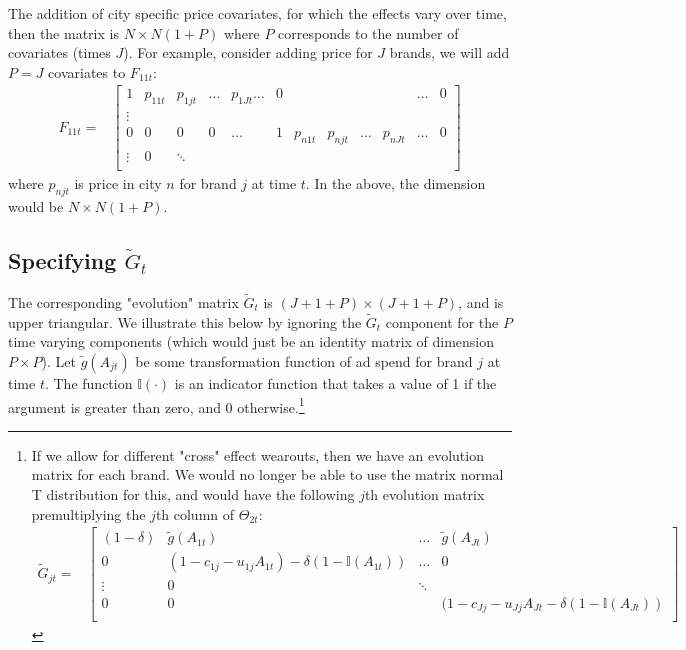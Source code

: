 \documentclass[letter,10pt]{article}
\newcommand{\Igtz}{\mathbb{I}}
\begin{document}
The addition of city specific price covariates, for which the effects vary over time, then the matrix is $N\times N(1+P)$
where $P$ corresponds to the number of covariates (times $J$).  For example, consider adding price for $J$ brands,
we will add $P=J$ covariates to $F_{11t}$:
\begin{equation}
\begin{array}{ll}
      F_{11t} = & \left[\begin{array}{cccccccccccc}
		 1 & p_{11t} & p_{1jt} & \ldots &p_{1Jt}\ldots & 0 &&&&&\ldots &0\\
\vdots\\
		0 &0 &0 &0 &\ldots & 1 & p_{n1t} & p_{njt} & \ldots &p_{nJt}  & \ldots & 0 \\
\vdots & 0 & \ddots \\
		\end{array}\right]
\end{array}
\end{equation}
where $p_{njt}$ is price in city $n$ for brand $j$ at time $t$.   In the above, the dimension would be $N \times N(1+P)$.


\subsection{Specifying $\tilde{G}_t$}

The corresponding "evolution" matrix $\tilde{G}_t$ is $(J+1+P)\times(J+1+P)$, and is upper triangular.  We illustrate
this below by ignoring the $\tilde{G}_t$ component for the $P$ time varying components (which would just be an identity matrix 
of dimension $P \times P$). Let
$\tilde{g}(A_{jt})$ be some transformation function of ad spend for
brand $j$ at time $t$.  The function $\Igtz(\cdot)$ is an indicator
function that takes a value of 1 if the argument is greater than zero,
and 0 otherwise.\footnote{If we allow for different "cross" effect wearouts, then we have an evolution matrix for each brand.  We would no longer
be able to use the matrix normal T distribution for this, and would have the following $j$th evolution matrix 
premultiplying the $j$th column of $\Theta_{2t}$:
\begin{equation}
\begin{array}{ll}
      \tilde{G}_{jt} = & \left[\begin{array}{cccl}
		 (1-\delta) & \tilde{g}(A_{1t}) & \ldots & \tilde{g}(A_{Jt}) \\
		0 & (1-c_{1j}-u_{1j} A_{1t}) - \delta(1-\Igtz(A_{1t})) & \ldots & 0 \\
\vdots & 0 & \ddots \\
		0 & 0 &  & (1-c_{Jj}-u_{Jj} A_{Jt} - \delta(1-\Igtz(A_{Jt})) \\
		\end{array}\right]
\end{array}
\end{equation}}  
\end{document}
